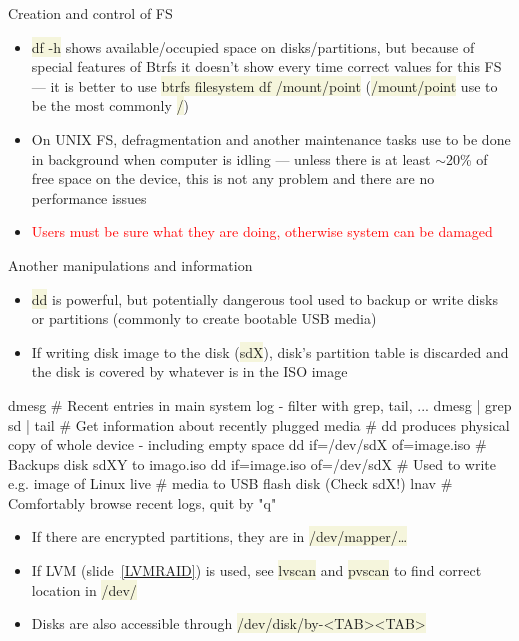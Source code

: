 \documentclass[compress, xelatex, 11pt, xcolor=svgnames, aspectratio=169, url={hyphens, lowtilde}]{beamer}
\renewcommand{\texttt}[1]{\colorbox{Beige}{{\ttfamily #1}}}
\renewcommand{\alert}[1]{\textcolor{red}{#1}}
\begin{document}
\begin{frame}[allowframebreaks]{Creation and control of FS}
\begin{itemize}
		\begin{itemize}
			\item In \href{https://en.opensuse.org/Portal:YaST}{openSUSE there is YaST} administrative module --- from command line launch \texttt{yast -{-}qt partitioner} for graphical or \texttt{yast disk} for text-based version
			\item All distributions have graphical tools like \href{https://gparted.org/}{GParted} where it is possible to comfortable manage disks
		\end{itemize}
		\item \texttt{df -h} shows available/occupied space on disks/partitions, but because of special features of Btrfs it doesn't show every time correct values for this FS --- it is better to use \texttt{btrfs filesystem df /mount/point} (\texttt{/mount/point} use to be the most commonly \texttt{/})
		\item On UNIX FS, defragmentation and another maintenance tasks use to be done in background when computer is idling --- unless there is at least $\sim$20\% of free space on the device, this is not any problem and there are no performance issues
		\item \alert{Users must be sure what they are doing, otherwise system can be damaged}
	\end{itemize}
\end{frame}

\begin{frame}[fragile]{Another manipulations and information}
	\begin{itemize}
		\item \texttt{dd} is powerful, but potentially dangerous tool used to backup or write disks or partitions (commonly to create bootable USB media)
		\item If writing disk image to the disk (\texttt{sdX}), disk's partition table is discarded and the disk is covered by whatever is in the ISO image
	\end{itemize}
	\begin{bashcode}
    dmesg # Recent entries in main system log - filter with grep, tail, ...
    dmesg | grep sd | tail # Get information about recently plugged media
    # dd produces physical copy of whole device - including empty space
    dd if=/dev/sdX of=image.iso # Backups disk sdXY to imago.iso
    dd if=image.iso of=/dev/sdX # Used to write e.g. image of Linux live
                                # media to USB flash disk (Check sdX!)
    lnav # Comfortably browse recent logs, quit by "q"
	\end{bashcode}
	\begin{itemize}
		\item If there are encrypted partitions, they are in \texttt{/dev/mapper/\ldots}
		\item If LVM (slide~\ref{LVMRAID}) is used, see \texttt{lvscan} and \texttt{pvscan} to find correct location in \texttt{/dev/}
		\item Disks are also accessible through \texttt{/dev/disk/by-<TAB><TAB>}
	\end{itemize}
\end{frame}
\end{document}
